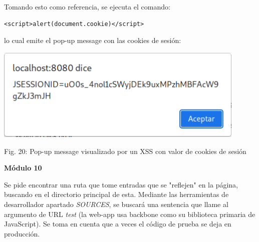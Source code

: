 \documentclass[12pt,oneside,a4paper]{book}
\begin{document}
\begin{enumerate}
\begin{enumerate}
        \vspace{2em}

        \hspace{20pt}
        Tomando esto como referencia, se ejecuta el comando:
        
        \vspace{1em}

        \begin{verbatim}
<script>alert(document.cookie)</script>
        \end{verbatim}

        lo cual emite el pop-up message con las cookies de sesión:

        \newpage

        \begin{center}
            \includegraphics[width=12cm]{img/xss6.png}
            
            \vspace{0.1em}
            
            Fig. 20: Pop-up message visualizado por un XSS con valor de cookies de sesión
        \end{center}
        
        \vspace{2em}

        \textbf{Módulo 10}
        
        \vspace{1em}

        \hspace{20pt}
        Se pide encontrar una ruta que tome entradas que se "reflejen" en la página, buscando en el directorio principal de esta. Mediante las herramientas de desarrollador apartado \textit{SOURCES}, se buscará una sentencia que llame al argumento de URL \textit{test} (la web-app usa backbone como su biblioteca primaria de JavaScript). Se toma en cuenta que a veces el código de prueba se deja en producción.
        
        \vspace{1em}


\end{enumerate}
\end{enumerate}
\end{document}
